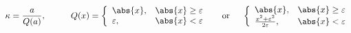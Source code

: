 \documentclass[]{article}
\begin{document}
\begin{equation*}
    \kappa =\frac{a}{Q(a)},\hspace{1cm}Q(x) = \left\{\begin{array}{ll} \abs{x}, & \abs{x}\ge \varepsilon \\
	\varepsilon, & \abs{x} < \varepsilon \\
    \end{array}\right.\hspace{5mm}\mbox{or}\hspace{5mm}
    \left\{\begin{array}{ll} \abs{x}, & \abs{x}\ge \varepsilon \\
	\frac{x^2+\varepsilon^2}{2\varepsilon}, & \abs{x} < \varepsilon \\ \end{array}\right.
\end{equation*}
\end{document}
